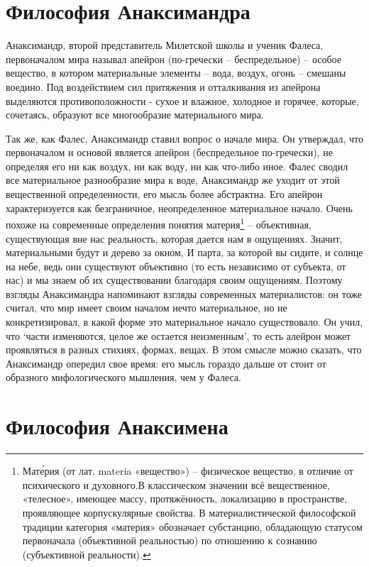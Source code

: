 \section{Философия
  Анаксимандра}

Анаксимандр, второй представитель Милетской школы и ученик Фалеса,
первоначалом мира называл апейрон (по-гречески -- беспредельное) --
особое вещество, в котором материальные элементы -- вода, воздух, огонь
-- смешаны воедино. Под воздействием сил притяжения и отталкивания из
апейрона выделяются противоположности - сухое и влажное, холодное и
горячее, которые, сочетаясь, образуют все многообразие материального
мира.

Так же, как Фалес, Анаксимандр ставил вопрос о начале мира. Он
утверждал, что первоначалом и основой является апейрон (беспредельное
по-гречески), не определяя его ни как воздух, ни как воду, ни как
что-либо иное. Фалес сводил все материальное разнообразие мира к воде,
Анаксимандр же уходит от этой вещественной определенности, его мысль
более абстрактна. Его апейрон характеризуется как безграничное,
неопределенное материальное начало. Очень похоже на современные
определения понятия материя\footnote{Мате́рия (от лат. materia
  «вещество») -- физическое вещество, в отличие от психического и
  духовного.В классическом значении всё вещественное, «телесное»,
  имеющее массу, протяжённость, локализацию в пространстве, проявляющее
  корпускулярные свойства. В материалистической философской традиции
  категория «материя» обозначает субстанцию, обладающую статусом
  первоначала (объективной реальностью) по отношению к сознанию
  (субъективной реальности).} -- объективная, существующая вне нас
реальность, которая дается нам в ощущениях. Значит, материальными будут
и дерево за окном, И парта, за которой вы сидите, и солнце на небе, ведь
они существуют объективно (то есть независимо от субъекта, от нас) и мы
знаем об их существо­вании благодаря своим ощущениям. Поэтому взгляды
Анакси­мандра напоминают взгляды современных материалистов: он тоже
считал, что мир имеет своим началом нечто материальное, но не
конкретизировал, в какой форме это материальное начало существовало. Он
учил, что `части изменяются, целое же остается неизменным', то есть
алейрон может проявляться в разных стихиях, формах, вещах. В этом смысле
можно сказать, что Анаксимандр опередил свое время: его мысль гораздо
дальше от­ стоит от образного мифологического мышления, чем у Фалеса.


\section{Философия Анаксимена}

